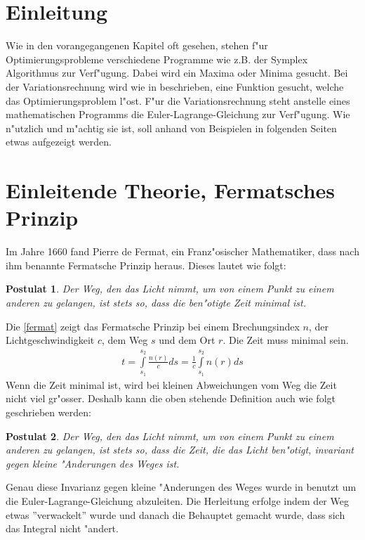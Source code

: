 \newtheorem{postulat}{Postulat}

\section{Einleitung}
Wie in den vorangegangenen Kapitel oft gesehen, stehen f"ur
Optimierungsprobleme verschiedene Programme wie z.B. der Symplex
Algorithmus zur Verf"ugung. Dabei wird ein Maxima oder Minima gesucht. Bei
der Variationsrechnung wird wie in 
beschrieben, eine Funktion gesucht, welche das Optimierungsproblem
l"ost. F"ur die Variationsrechnung steht anstelle eines mathematischen
Programms die Euler-Lagrange-Gleichung zur Verf"ugung. Wie n"utzlich und
m"achtig sie ist, soll anhand von Beispielen in folgenden Seiten etwas
aufgezeigt werden.
\section{Einleitende Theorie, Fermatsches Prinzip}
Im Jahre 1660 fand Pierre de Fermat, ein Franz"osischer Mathematiker,
dass  nach ihm benannte Fermatsche Prinzip heraus. 
Dieses lautet wie folgt:
\begin{postulat}
	Der Weg, den das Licht nimmt, 
	um von einem Punkt zu einem anderen zu gelangen, 
	ist stets so, dass die ben"otigte Zeit minimal ist.
	\cite{DefinitionFermat}
\end{postulat}
Die \eqref{fermat} zeigt das Fermatsche Prinzip bei einem Brechungsindex
$n$, 
der Lichtgeschwindigkeit $c$, dem Weg $s$ und dem Ort $r$. Die Zeit muss
minimal sein.
\begin{align}
	t= \int\limits_{s_1}^{s_2} \frac{n(r)}{c} ds = \frac{1}{c} \int\limits_{s_1}^{s_2} n(r) ds
	\label{fermat}
\end{align}
Wenn die Zeit minimal ist, wird bei kleinen Abweichungen vom Weg die
Zeit nicht viel gr"osser. 
Deshalb kann die oben stehende Definition auch wie folgt geschrieben werden:
\begin{postulat}
Der Weg, den das Licht nimmt,  um von einem Punkt zu einem anderen zu
gelangen, 
ist stets so, dass die Zeit, die das Licht ben"otigt, invariant gegen
kleine "Anderungen des Weges ist.  \cite{DefinitionFermat}
\end{postulat}
Genau diese Invarianz gegen kleine "Anderungen des Weges
wurde in  benutzt um die
Euler-Lagrange-Gleichung abzuleiten. Die Herleitung erfolge indem der
Weg etwas ''verwackelt'' wurde und danach die Behauptet gemacht wurde,
dass sich das Integral nicht "andert.
